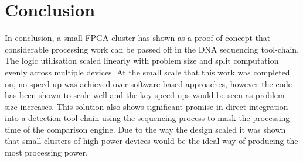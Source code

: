 \documentclass[conference]{IEEEtran}
\begin{document}
%


\section{Conclusion}
In conclusion, a small FPGA cluster has shown as a proof of concept that considerable processing work can be passed off in the DNA sequencing tool-chain. The logic utilisation scaled linearly with problem size and split computation evenly across multiple devices. At the small scale that this work was completed on, no speed-up was achieved over software based approaches, however the code has been shown to scale well and the key speed-ups would be seen as problem size increases. This solution also shows significant promise in direct integration into a detection tool-chain using the sequencing process to mask the processing time of the comparison engine. Due to the way the design scaled it was shown that small clusters of high power devices would be the ideal way of producing the most processing power.



\end{document}
